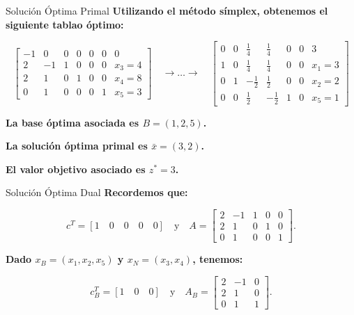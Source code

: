 \documentclass{beamer}
\begin{document}
\begin{frame}{Solución Óptima Primal}
    \textbf{Utilizando el método símplex, obtenemos el siguiente \textbf{tablao óptimo}:}

    \[
    \left[ \begin{array}{cccccc|c}
    -1 & 0 & 0 & 0 & 0 & 0 & 0 \\
    2 & -1 & 1 & 0 & 0 & 0 & x_3 = 4 \\
    2 & 1 & 0 & 1 & 0 & 0 & x_4 = 8 \\
    0 & 1 & 0 & 0 & 0 & 1 & x_5 = 3
    \end{array} \right]
    \quad \rightarrow \ldots \rightarrow \quad
    \left[ \begin{array}{cccccc|c}
    0 & 0 & \frac{1}{4} & \frac{1}{4} & 0 & 0 & 3 \\
    1 & 0 & \frac{1}{4} & \frac{1}{4} & 0 & 0 & x_1 = 3 \\
    0 & 1 & -\frac{1}{2} & \frac{1}{2} & 0 & 0 & x_2 = 2 \\
    0 & 0 & \frac{1}{2} & -\frac{1}{2} & 1 & 0 & x_5 = 1
    \end{array} \right]
    \]

    \vspace{0.5cm}
    \textbf{La base óptima asociada es \( B = (1, 2, 5) \).}

    \vspace{0.3cm}
    \textbf{La solución óptima primal es \(\bar{x} = (3, 2)\).}

    \vspace{0.3cm}
    \textbf{El valor objetivo asociado es \( z^* = 3 \).}
\end{frame}

\begin{frame}{Solución Óptima Dual}
    \textbf{Recordemos que:}

    \[
    c^T = \left[ 1 \quad 0 \quad 0 \quad 0 \quad 0 \right] \quad \text{y} \quad A = \left[ \begin{array}{ccccc}
    2 & -1 & 1 & 0 & 0 \\
    2 & 1 & 0 & 1 & 0 \\
    0 & 1 & 0 & 0 & 1
    \end{array} \right].
    \]

    \vspace{0.5cm}
    \textbf{Dado \( x_B = (x_1, x_2, x_5) \) y \( x_N = (x_3, x_4) \), tenemos:}

    \[
    c_B^T = \left[ 1 \quad 0 \quad 0 \right] \quad \text{y} \quad A_B = \left[ \begin{array}{ccc}
    2 & -1 & 0 \\
    2 & 1 & 0 \\
    0 & 1 & 1
    \end{array} \right].
    \]
\end{frame}
\end{document}
